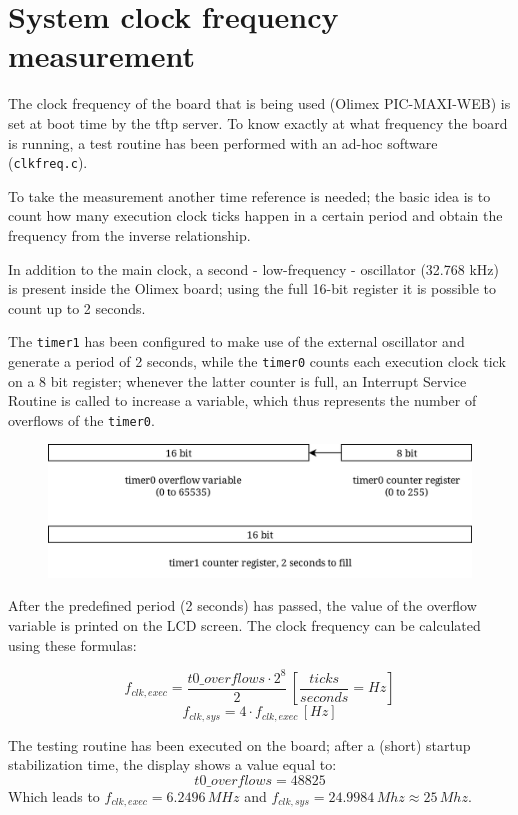 \section{System clock frequency measurement}
The clock frequency of the board that is being used (Olimex PIC-MAXI-WEB) is set at boot time by the tftp server. To know exactly at what frequency the board is running, a test routine has been performed with an ad-hoc software (\texttt{clkfreq.c}).

To take the measurement another time reference is needed; the basic idea is to count how many execution clock ticks happen in a certain period and obtain the frequency from the inverse relationship.

In addition to the main clock, a second - low-frequency - oscillator (32.768 kHz) is present inside the Olimex board; using the full 16-bit register it is possible to count up to 2 seconds.

The \texttt{timer1} has been configured to make use of the external oscillator and generate a period of 2 seconds, while the \texttt{timer0} counts each execution clock tick on a 8 bit register; whenever the latter counter is full, an Interrupt Service Routine is called to increase a variable, which thus represents the number of overflows of the \texttt{timer0}.\\

\begin{figure}[h]
	\centering
	\includegraphics[width=0.7\linewidth]{images/timers}
	\label{fig:timers}
\end{figure}

After the predefined period (2 seconds) has passed, the value of the overflow variable is printed on the LCD screen. The clock frequency can be calculated using these formulas:

$$ f_{clk,exec} = \frac{t0\_overflows \cdot 2^8}{2}\, \left[{\frac{ticks}{seconds} = Hz}\right]$$
$$ f_{clk,sys} = 4 \cdot f_{clk,exec}\,\left[Hz\right] $$

The testing routine has been executed on the board; after a (short) startup stabilization time, the display shows a value equal to:
$$ t0\_overflows = 48825 $$
Which leads to $f_{clk,exec} = 6.2496\,MHz$ and $f_{clk,sys} = 24.9984\,Mhz \approx 25\,Mhz$.\\

